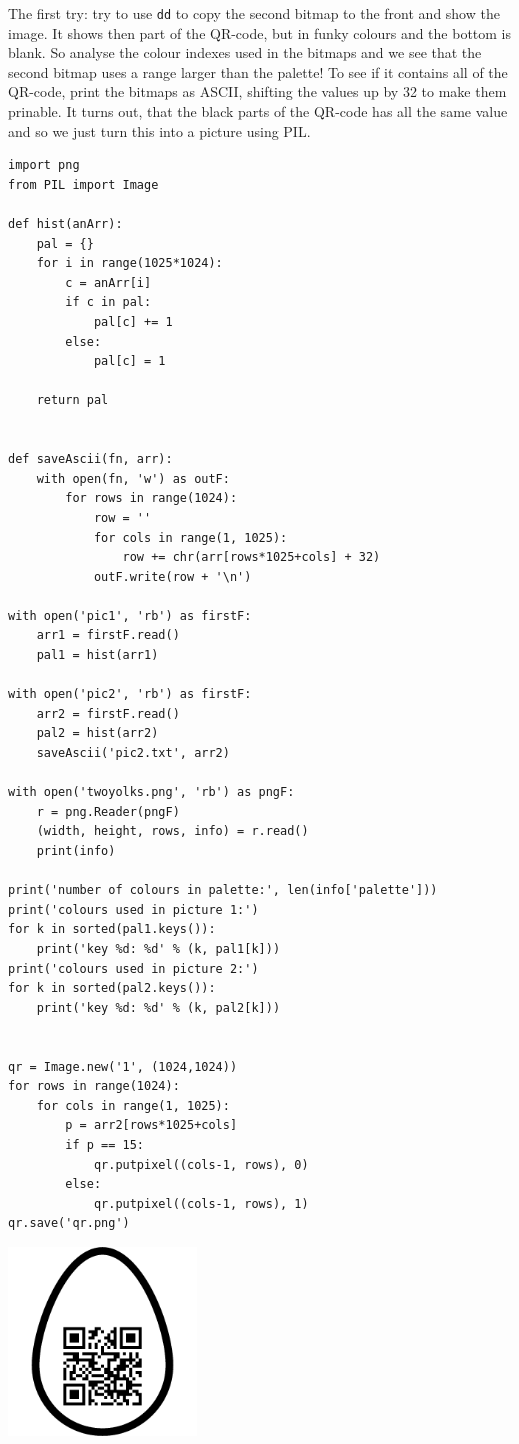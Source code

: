 \documentclass[english,a4paper,nols,noindent]{tufte-handout}
\begin{document}
The first try: try to use \verb+dd+ to copy the second bitmap to the front and
show the image.  It shows then part of the QR-code, but in funky colours and
the bottom is blank.  So analyse the colour indexes used in the bitmaps and we
see that the second bitmap uses a range larger than the palette!  To see if it
contains all of the QR-code, print the bitmaps as ASCII, shifting the values up
by 32 to make them prinable.  It turns out, that the black parts of the QR-code
has all the same value and so we just turn this into a picture using PIL.

\begin{verbatim}
import png
from PIL import Image

def hist(anArr):
    pal = {}
    for i in range(1025*1024):
        c = anArr[i]
        if c in pal:
            pal[c] += 1
        else:
            pal[c] = 1

    return pal


def saveAscii(fn, arr):
    with open(fn, 'w') as outF:
        for rows in range(1024):
            row = ''
            for cols in range(1, 1025):
                row += chr(arr[rows*1025+cols] + 32)
            outF.write(row + '\n')

with open('pic1', 'rb') as firstF:
    arr1 = firstF.read()
    pal1 = hist(arr1)

with open('pic2', 'rb') as firstF:
    arr2 = firstF.read()
    pal2 = hist(arr2)
    saveAscii('pic2.txt', arr2)

with open('twoyolks.png', 'rb') as pngF:
    r = png.Reader(pngF)
    (width, height, rows, info) = r.read()
    print(info)

print('number of colours in palette:', len(info['palette']))
print('colours used in picture 1:')
for k in sorted(pal1.keys()):
    print('key %d: %d' % (k, pal1[k]))
print('colours used in picture 2:')
for k in sorted(pal2.keys()):
    print('key %d: %d' % (k, pal2[k]))


qr = Image.new('1', (1024,1024))
for rows in range(1024):
    for cols in range(1, 1025):
        p = arr2[rows*1025+cols]
        if p == 15:
            qr.putpixel((cols-1, rows), 0)
        else:
            qr.putpixel((cols-1, rows), 1)
qr.save('qr.png')
\end{verbatim} 

\begin{marginfigure}
    \includegraphics[width=50mm]{ch32/qr.png}
\end{marginfigure}
\end{document}
